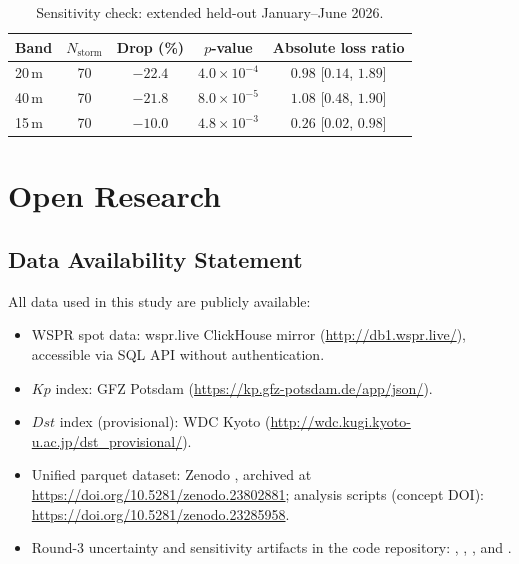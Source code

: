 \documentclass{agujournal2019}
\begin{document}
\begin{table}[h]
	\centering
	\small
	\caption{Sensitivity check: extended held-out January--June 2026.}
	\label{tab:heldout_sensitivity}
	\begin{tabular}{lcccc}
		\toprule
		Band & $N_{\text{storm}}$ & Drop (\%) & $p$-value & Absolute loss ratio \\
		\midrule
		20\,m & 70 & $-22.4$ & $4.0 \times 10^{-4}$ & $0.98$ [$0.14$, $1.89$] \\
		40\,m & 70 & $-21.8$ & $8.0 \times 10^{-5}$ & $1.08$ [$0.48$, $1.90$] \\
		15\,m & 70 & $-10.0$ & $4.8 \times 10^{-3}$ & $0.26$ [$0.02$, $0.98$] \\
		\bottomrule
	\end{tabular}
\end{table}


\section*{Open Research}

\subsection*{Data Availability Statement}

All data used in this study are publicly available:

{\sloppy
\begin{itemize}
	\item WSPR spot data: wspr.live ClickHouse mirror
	      (\url{http://db1.wspr.live/}), accessible via SQL API without
	      authentication.
	\item $Kp$ index: GFZ Potsdam
	      (\url{https://kp.gfz-potsdam.de/app/json/}).
	\item $Dst$ index (provisional): WDC Kyoto
	      (\url{http://wdc.kugi.kyoto-u.ac.jp/dst_provisional/}).
	\item Unified parquet dataset: Zenodo
	      \citep{crosscorr_data}, archived at
	      \url{https://doi.org/10.5281/zenodo.23802881}; analysis scripts
	      (concept DOI): \url{https://doi.org/10.5281/zenodo.23285958}.
	\item Round-3 uncertainty and sensitivity artifacts in the code
	      repository: ,
	      ,
	      , and
	      .
\end{itemize}
\par}
\end{document}
